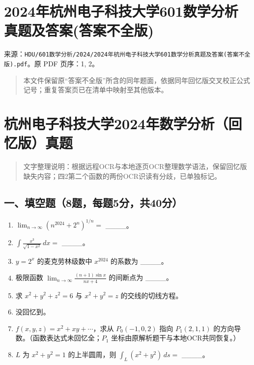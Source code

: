 \documentclass[11pt,fontset=fandol]{ctexart}
\begin{document}
\section{2024年杭州电子科技大学601数学分析真题及答案(答案不全版)}\label{ux5e74ux676dux5ddeux7535ux5b50ux79d1ux6280ux5927ux5b66601ux6570ux5b66ux5206ux6790ux771fux9898ux53caux7b54ux6848ux7b54ux6848ux4e0dux5168ux7248}

来源：\texttt{HDU/601数学分析/2024/2024年杭州电子科技大学601数学分析真题及答案(答案不全版).pdf}。原
PDF 页序：1, 2。

\begin{quote}
本文件保留原``答案不全版''所含的同年题面，依据同年回忆版交叉校正公式记号；重复答案页已在清单中映射至其他版本。
\end{quote}

\section{杭州电子科技大学2024年数学分析（回忆版）真题}\label{ux676dux5ddeux7535ux5b50ux79d1ux6280ux5927ux5b662024ux5e74ux6570ux5b66ux5206ux6790ux56deux5fc6ux7248ux771fux9898}

\begin{quote}
文字整理说明：根据远程OCR与本地逐页OCR整理数学语法，保留回忆版缺失内容；四2第二个函数的两份OCR识读有分歧，已单独标记。
\end{quote}

\subsection{一、填空题（8题，每题5分，共40分）}\label{ux4e00ux586bux7a7aux98988ux9898ux6bcfux98985ux5206ux517140ux5206}

\begin{enumerate}
\def\labelenumi{\arabic{enumi}.}
\item
  \(\displaystyle\lim_{n\to\infty}(n^{2024}+2^n)^{1/n}=\) \_\_\_\_。
\item
  \(\displaystyle\int\frac{x^3}{\sqrt{1-x^2}}\,dx=\) \_\_\_\_。
\item
  \(y=2^x\) 的麦克劳林级数中 \(x^{2024}\) 的系数为 \_\_\_\_。
\item
  极限函数 \(\displaystyle\lim_{n\to\infty}\frac{(n+1)\sin x}{nx+4}\)
  的间断点为 \_\_\_\_。
\item
  求 \(x^2+y^2+z^2=6\) 与 \(x^2+y^2=z\) 的交线的切线方程。
\item
  没回忆到。
\item
  \(f(x,y,z)=x^2+xy+\cdots\)，求从 \(P_0(-1,0,2)\) 指向 \(P_1(2,1,1)\)
  的方向导数。（函数表达式未回忆全；\(P_1\)
  坐标由原解析题干与本地OCR共同恢复。）
\item
  \(L\) 为 \(x^2+y^2=1\) 的上半圆周，则
  \(\displaystyle\int_L(x^2+y^2)\,ds=\) \_\_\_\_。
\end{enumerate}
\end{document}
